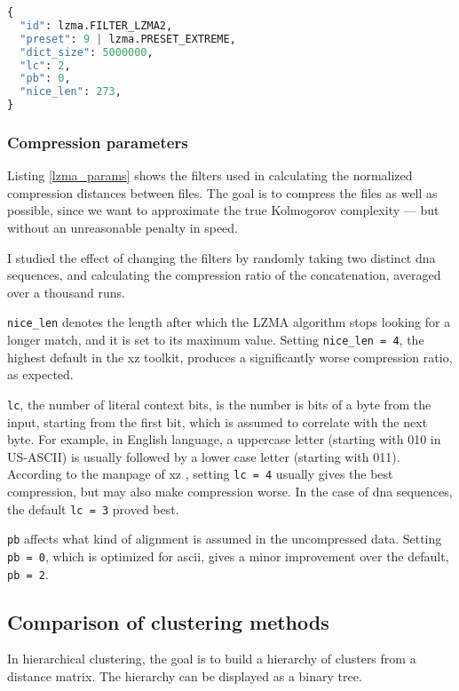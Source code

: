 \begin{lstlisting}[language=Python,frame=single,caption=Parameters for
compression using the LZMA algorithm.,label=lzma_params]
{
  "id": lzma.FILTER_LZMA2,
  "preset": 9 | lzma.PRESET_EXTREME,
  "dict_size": 5000000,
  "lc": 2,
  "pb": 0,
  "nice_len": 273,
}
\end{lstlisting}

\subsubsection{Compression parameters}

Listing \ref{lzma_params} shows the filters used in calculating the normalized compression distances between files. The goal is to compress the files as well as possible, since we want to approximate the true Kolmogorov complexity --- but without an unreasonable penalty in speed.

I studied the effect of changing the filters by randomly taking two distinct dna sequences, and calculating the compression ratio of the concatenation, averaged over a thousand runs.

\lstinline{nice_len} denotes the length after which the LZMA algorithm stops looking for a longer match, and it is set to its maximum value. Setting \lstinline{nice_len = 4}, the highest default in the xz toolkit, produces a significantly worse compression ratio, as expected.

\lstinline{lc}, the number of literal context bits, is the number is bits of a byte from the input, starting from the first bit, which is assumed to correlate with the next byte. For example, in English language, a uppercase letter (starting with 010 in US-ASCII) is usually followed by a lower case letter (starting with 011). According to the manpage of xz \cite{XzManpage}, setting \lstinline{lc = 4} usually gives the best compression, but may also make compression worse. In the case of dna sequences, the default \lstinline{lc = 3} proved best.

\lstinline{pb} affects what kind of alignment is assumed in the uncompressed data. Setting \lstinline{pb = 0}, which is optimized for ascii, gives a minor improvement over the default, \lstinline{pb = 2}.

\subsection{Comparison of clustering methods}

In hierarchical clustering, the goal is to build a hierarchy of clusters from a distance matrix. The hierarchy can be displayed as a binary tree.

